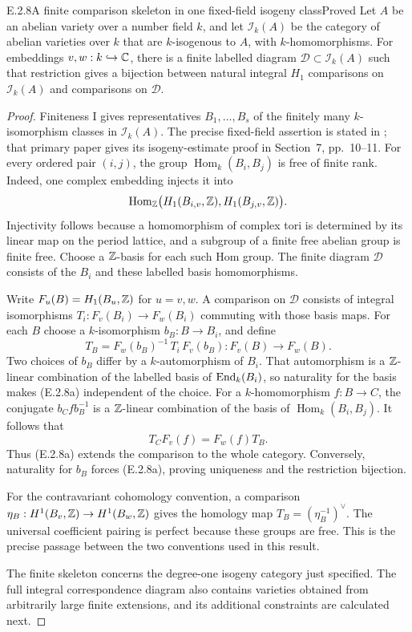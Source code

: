 \begin{result}{E.2.8}{A finite comparison skeleton in one fixed-field isogeny class}{Proved}
Let $A$ be an abelian variety over a number field $k$, and let
$\mathcal I_k(A)$ be the category of abelian varieties over $k$ that are
$k$-isogenous to $A$, with $k$-homomorphisms. For embeddings
$v,w:k\hookrightarrow\mathbb C$, there is a finite labelled diagram
$\mathcal D\subset\mathcal I_k(A)$ such that restriction gives a bijection
between natural integral $H_1$ comparisons on $\mathcal I_k(A)$ and
comparisons on $\mathcal D$.
\end{result}
\begin{proof}
Finiteness I gives representatives $B_1,\ldots,B_s$ of the finitely many
$k$-isomorphism classes in $\mathcal I_k(A)$. The precise fixed-field
assertion is stated in \cite[Introduction, p.~1]{GenMW1991}; that primary
paper gives its isogeny-estimate proof in Section~7, pp.~10--11.
For every ordered pair $(i,j)$, the group
$\operatorname{Hom}_k(B_i,B_j)$ is free of finite rank. Indeed, one
complex embedding injects it into
\[
 \operatorname{Hom}_{\mathbb Z}
       \bigl(H_1(B_{i,v},\mathbb Z),H_1(B_{j,v},\mathbb Z)\bigr).
\]
Injectivity follows because a homomorphism of complex tori is determined
by its linear map on the period lattice, and a subgroup of a finite free
abelian group is finite free. Choose a $\mathbb Z$-basis for each such Hom
group. The finite diagram $\mathcal D$ consists of the $B_i$ and these
labelled basis homomorphisms.

Write $F_u(B)=H_1(B_u,\mathbb Z)$ for $u=v,w$. A comparison on $\mathcal D$
consists of integral isomorphisms $T_i:F_v(B_i)\to F_w(B_i)$ commuting
with those basis maps. For each $B$ choose a $k$-isomorphism
$b_B:B\to B_i$, and define
\[
 T_B=F_w(b_B)^{-1}\,T_i\,F_v(b_B):
               F_v(B)\longrightarrow F_w(B).
 \tag{E.2.8a}
\]
Two choices of $b_B$ differ by a $k$-automorphism of $B_i$.
That automorphism is a $\mathbb Z$-linear combination of the labelled basis
of $\operatorname{End}_k(B_i)$, so naturality for the basis makes (E.2.8a)
independent of the choice. For a $k$-homomorphism $f:B\to C$,
the conjugate $b_Cfb_B^{-1}$ is a $\mathbb Z$-linear combination of the
basis of $\operatorname{Hom}_k(B_i,B_j)$. It follows that
\[
 T_C F_v(f)=F_w(f)T_B.
\]
Thus (E.2.8a) extends the comparison to the whole category. Conversely,
naturality for $b_B$ forces (E.2.8a), proving uniqueness and the
restriction bijection.

For the contravariant cohomology convention, a comparison
$\eta_B:H^1(B_v,\mathbb Z)\to H^1(B_w,\mathbb Z)$ gives the homology map
$T_B=(\eta_B^{-1})^\vee$. The universal coefficient pairing is perfect
because these groups are free. This is the precise passage between the
two conventions used in this result.

The finite skeleton concerns the degree-one isogeny category just
specified. The full integral correspondence diagram also contains
varieties obtained from arbitrarily large finite extensions, and its
additional constraints are calculated next.
\end{proof}

